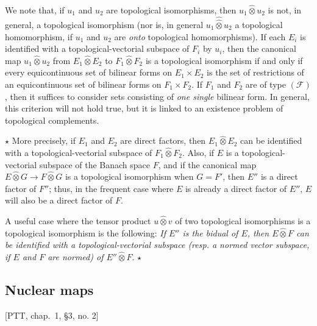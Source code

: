 \documentclass[british]{article}
\newcommand{\oldpage}[1]{\marginpar{\footnotesize$\Big\vert$ \textit{p.~#1}}}
\begin{document}
We note that, if \(u_1\) and \(u_2\) are topological isomorphisms, then
\(u_1\hat{\otimes}u_2\) is not, in general, a topological isomorphism
(nor is, in general \(u_1\hat{\hat{\otimes}}u_2\) a topological
homomorphism, if \(u_1\) and \(u_2\) are \emph{onto} topological
homomorphisms). If each \(E_i\) is identified with a
topological-vectorial subspace of \(F_i\) by \(u_i\), then the canonical
map \(u_1\hat{\otimes}u_2\) from \(E_1\hat{\otimes}E_2\) to
\(F_1\hat{\otimes}F_2\) is a topological isomorphism if and only if
every equicontinuous set of bilinear forms on \(E_1\times E_2\) is the
set of restrictions of an equicontinuous set of bilinear forms on
\(F_1\times F_2\). \oldpage{85} If \(F_1\) and \(F_2\) are of type
\((\mathscr{F})\), then it suffices to consider sets consisting of
\emph{one single} bilinear form. In general, this criterion will not
hold true, but it is linked to an existence problem of topological
complements.

\(\star\) More precisely, if \(E_1\) and \(E_2\) are direct factors,
then \(E_1\hat{\otimes}E_2\) can be identified with a
topological-vectorial subspace of \(F_1\hat{\otimes}F_2\). Also, if
\(E\) is a topological-vectorial subspace of the Banach space \(F\), and
if the canonical map \(E\hat{\otimes}G\to F\hat{\otimes}G\) is a
topological isomorphism when \(G=F'\), then \(E''\) is a direct factor
of \(F''\); thus, in the frequent case where \(E\) is already a direct
factor of \(E''\), \(E\) will also be a direct factor of \(F\).

A useful case where the tensor product \(u\hat{\otimes}v\) of two
topological isomorphisms is a topological isomorphism is the following:
\emph{If \(E''\) is the bidual of \(E\), then \(E\hat{\otimes}F\) can be
identified with a topological-vectorial subspace (resp. a normed vector
subspace, if \(E\) and \(F\) are normed) of \(E''\hat{\otimes}F\)}.
\(\star\)

\subsection{Nuclear maps}\label{section-1.7}

{[}PTT, chap.~1, §3, no. 2{]} \medskip
\end{document}

